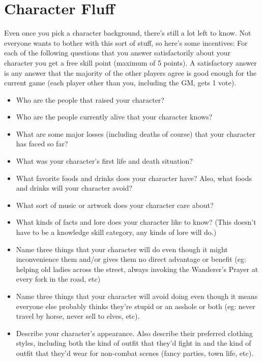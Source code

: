 \section{Character Fluff}

Even once you pick a character background, there's still a lot left to know. Not everyone wants to bother with this sort of stuff, so here's some incentives: For each of the following questions that you answer satisfactorily about your character you get a free skill point (maximum of 5 points). A satisfactory answer is any answer that the majority of the other players agree is good enough for the current game (each player other than you, including the GM, gets 1 vote).

\begin{itemize}
\item Who are the people that raised your character?
\item Who are the people currently alive that your character knows?
\item What are some major losses (including deaths of course) that your character has faced so far?
\item What was your character's first life and death situation?
\item What favorite foods and drinks does your character have? Also, what foods and drinks will your character avoid?
\item What sort of music or artwork does your character care about?
\item What kinds of facts and lore does your character like to know? (This doesn't have to be a knowledge skill category, any kinds of lore will do.)
\item Name three things that your character will do even though it might inconvenience them and/or gives them no direct advantage or benefit (eg: helping old ladies across the street, always invoking the Wanderer's Prayer at every fork in the road, etc)
\item Name three things that your character will avoid doing even though it means everyone else probably thinks they're stupid or an asshole or both (eg: never travel by horse, never sell to elves, etc).
\item Describe your character's appearance. Also describe their preferred clothing styles, including both the kind of outfit that they'd fight in and the kind of outfit that they'd wear for non-combat scenes (fancy parties, town life, etc).
\end{itemize}